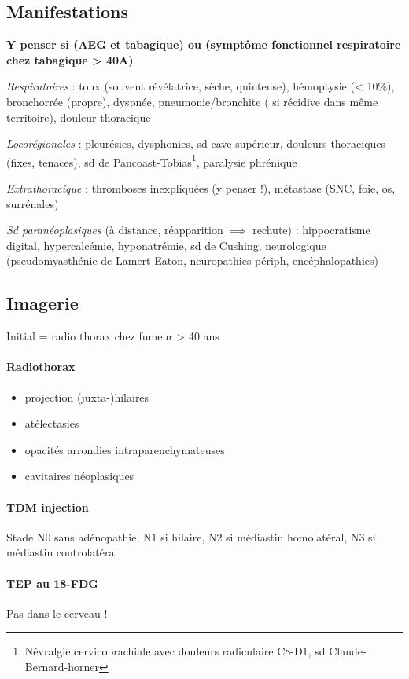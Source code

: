 \subsection{Manifestations}
\textbf{Y penser si (AEG et tabagique) ou (symptôme fonctionnel respiratoire
  chez tabagique > 40A)}

\textit{Respiratoires}  : toux (souvent révélatrice, sèche, quinteuse), hémoptysie (<
10\%), bronchorrée (propre), dyspnée, pneumonie/bronchite (\danger{} si récidive
dans même territoire), douleur thoracique 

\textit{Locorégionales}  : pleurésies, dysphonies, sd cave supérieur, douleurs thoraciques
(fixes, tenaces), sd de Pancoast-Tobias\footnote{Névralgie cervicobrachiale avec
  douleurs radiculaire C8-D1, sd Claude-Bernard-horner}, paralysie phrénique

\textit{Extrathoracique}  : thromboses inexpliquées (y penser !), métastase (SNC,
foie, os, surrénales)

\textit{Sd paranéoplasiques} (à distance, réapparition $\implies$ rechute) :
hippocratisme digital, hypercalcémie, hyponatrémie, sd de Cushing, neurologique
(pseudomyasthénie de Lamert Eaton, neuropathies périph, encéphalopathies)

\subsection{Imagerie}
Initial = radio thorax chez fumeur > 40 ans
\paragraph{Radiothorax}
\begin{itemize}
\item projection (juxta-)hilaires
\item atélectasies
\item opacités arrondies intraparenchymateuses
\item cavitaires néoplasiques
\end{itemize}

\paragraph{TDM injection}
Stade N0 sans adénopathie, N1 si hilaire, N2 si médiastin homolatéral, N3 si médiastin
controlatéral

\paragraph{TEP au 18-FDG}
Pas dans le cerveau !

